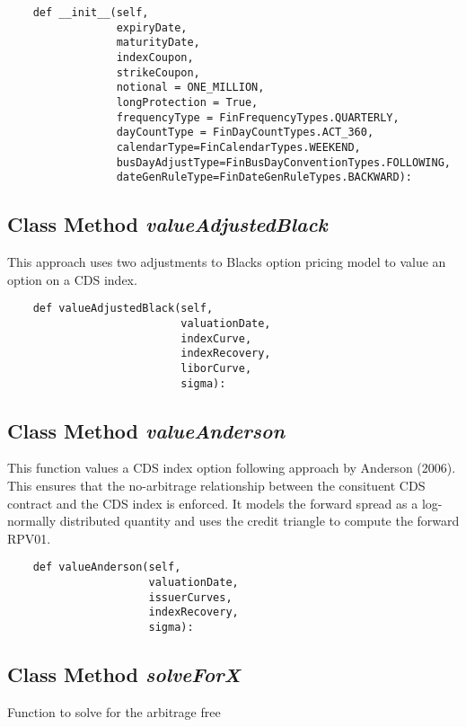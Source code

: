 \documentclass[twoside,11pt]{book}
\begin{document}
\begin{lstlisting}
    def __init__(self,
                 expiryDate,
                 maturityDate,
                 indexCoupon,
                 strikeCoupon,
                 notional = ONE_MILLION,
                 longProtection = True,
                 frequencyType = FinFrequencyTypes.QUARTERLY,
                 dayCountType = FinDayCountTypes.ACT_360,
                 calendarType=FinCalendarTypes.WEEKEND,
                 busDayAdjustType=FinBusDayConventionTypes.FOLLOWING,
                 dateGenRuleType=FinDateGenRuleTypes.BACKWARD):
\end{lstlisting}

\subsection{Class Method {\it valueAdjustedBlack}}
This approach uses two adjustments to Blacks option pricing model to value an option on a CDS index. 

\begin{lstlisting}
    def valueAdjustedBlack(self, 
                           valuationDate, 
                           indexCurve, 
                           indexRecovery,
                           liborCurve,
                           sigma):
\end{lstlisting}

\subsection{Class Method {\it valueAnderson}}
This function values a CDS index option following approach by Anderson (2006). This ensures that the no-arbitrage relationship between the consituent CDS contract and the CDS index is enforced. It models the forward spread as a log-normally distributed quantity and uses the credit triangle to compute the forward RPV01. 

\begin{lstlisting}
    def valueAnderson(self,
                      valuationDate,
                      issuerCurves,
                      indexRecovery,
                      sigma):
\end{lstlisting}

\subsection{Class Method {\it solveForX}}
Function to solve for the arbitrage free 
\end{document}
